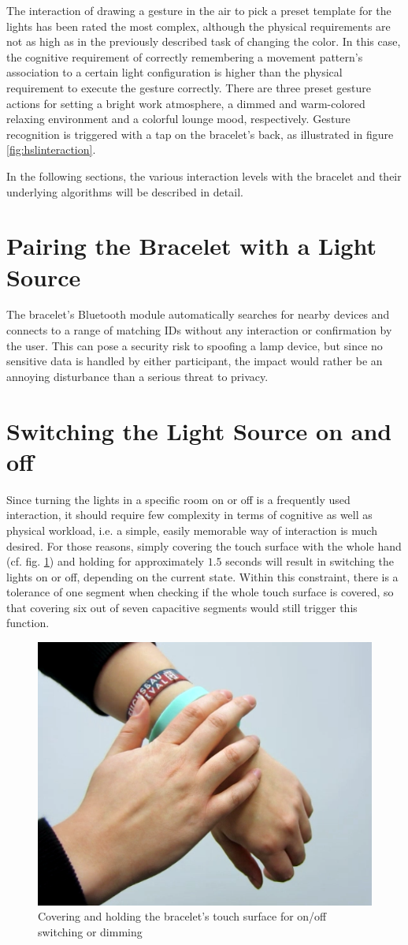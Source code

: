 The interaction of drawing a gesture in the air to pick a preset template for the lights has been rated the most complex, although the physical requirements are not as high as in the previously described task of changing the color. In this case, the cognitive requirement of correctly remembering a movement pattern's association to a certain light configuration is higher than the physical requirement to execute the gesture correctly. There are three preset gesture actions for setting a bright work atmosphere, a dimmed and warm-colored relaxing environment and a colorful lounge mood, respectively. Gesture recognition is triggered with a tap on the bracelet's back, as illustrated in figure \ref{fig:hslinteraction}.

In the following sections, the various interaction levels with the bracelet and their underlying algorithms will be described in detail.

\section{Pairing the Bracelet with a Light Source}
The bracelet's Bluetooth module automatically searches for nearby devices and connects to a range of matching IDs without any interaction or confirmation by the user. This can pose a security risk to spoofing a lamp device, but since no sensitive data is handled by either participant, the impact would rather be an annoying disturbance than a serious threat to privacy.

\section{Switching the Light Source on and off}
\label{sec:onoff}
Since turning the lights in a specific room on or off is a frequently used interaction, it should require few complexity in terms of cognitive as well as physical workload, i.e. a simple, easily memorable way of interaction is much desired. For those reasons, simply covering the touch surface with the whole hand (cf. fig. \ref{fig:onoff}) and holding for approximately $1.5$ seconds will result in switching the lights on or off, depending on the current state. Within this constraint, there is a tolerance of one segment when checking if the whole touch surface is covered, so that covering six out of seven capacitive segments would still trigger this function.

\begin{figure}[bth]
	\myfloatalign
		\includegraphics[width=.45\linewidth]{gfx/cover_touch.png}
	\caption{Covering and holding the bracelet's touch surface for on/off switching or dimming} \label{fig:onoff}
\end{figure}


